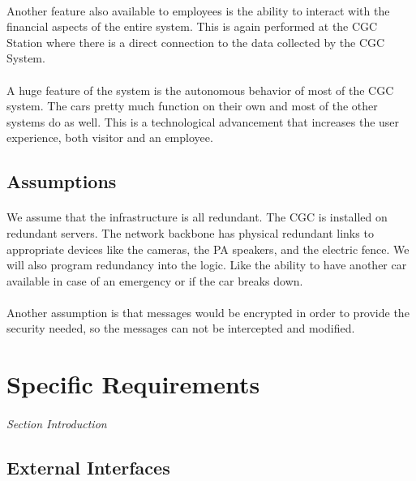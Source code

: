 \documentclass[12pt]{article}
\begin{document}
    \paragraph{} Another feature also available to employees is the ability to interact with the financial aspects of the entire system. This is again performed at the CGC Station where there is a direct connection to the data collected by the CGC System.
        
    \paragraph{} A huge feature of the system is the autonomous behavior of most of the CGC system. The cars pretty much function on their own and most of the other systems do as well. This is a technological advancement that increases the user experience, both visitor and an employee.
    
    \subsection{Assumptions}
    \paragraph{} We assume that the infrastructure is all redundant. The CGC is 
    installed on redundant servers. The network backbone has physical redundant 
    links to appropriate devices like the cameras, the PA speakers, and the 
    electric fence. We will also    program redundancy into the logic. Like the 
    ability to have another car available in case of an emergency or if the car 
    breaks down.    
    \paragraph{} Another assumption is that messages would be encrypted in order 
    to provide the security needed, so the messages can not be intercepted and 
    modified.

\section{Specific Requirements} \label{spec} %
\paragraph{} \textit{Section Introduction}

    \subsection{External Interfaces} \label{inter}%
\end{document}

